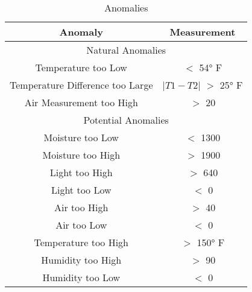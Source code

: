 \begin{table}[!t]
    \caption{Anomalies}
    \centering
    \begin{tabular}{| c | c |}
    \hline
    Anomaly & Measurement\\ [0.5ex] %
    \hline
    \multicolumn{2}{|c|}{Natural Anomalies} \\
    \hline
    Temperature too Low & $<$ 54° F \\
    Temperature Difference too Large & $|T1-T2|$ $>$ 25° F \\
    Air Measurement too High & $>$ 20 \\
    \hline
    \multicolumn{2}{|c|}{Potential Anomalies} \\
    \hline
    Moisture too Low & $<$ 1300 \\
    Moisture too High & $>$ 1900 \\
    Light too High & $>$ 640 \\
    Light too Low & $<$ 0 \\
    Air too High & $>$ 40 \\
    Air too Low & $<$ 0 \\
    Temperature too High & $>$ 150° F \\
    Humidity too High & $>$ 90 \\
    Humidity too Low & $<$ 0 \\
    \hline
    \end{tabular}
    \label{table:anoms}
\end{table}

